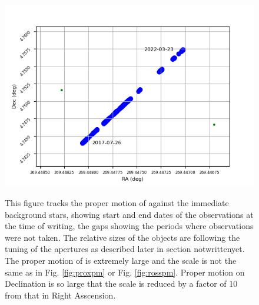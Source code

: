 \begin{figure}[!htbp]
\begin{center}
\includegraphics[scale=1]{images/pmbstar.png} \\
\end{center}   
\caption{This figure tracks the proper motion of {\bstar} against the immediate
background stars, showing start and end dates of the observations at the time
of writing, the gaps showing the periods where observations were not taken. The
relative sizes of the objects are following the tuning of the apertures as
described later in section notwrittenyet. The proper motion of {\bstar} is
extremely large and the scale is not the same as in Fig. \ref{fig:proxpm} or
Fig.  \ref{fig:rosspm}. Proper motion on Declination is so large that the scale
is reduced by a factor of 10 from that in Right Asscension.} \protect\label{fig:bspm}
\end{figure}

